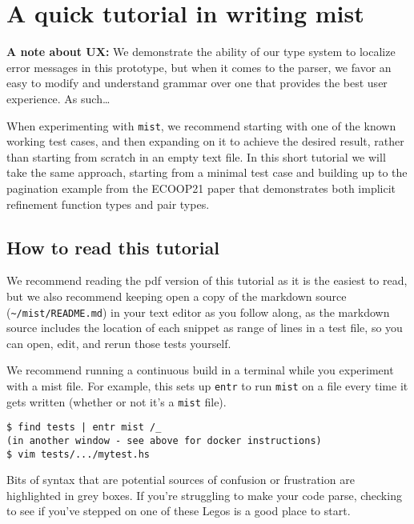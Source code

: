 \documentclass[
]{darts-v2021}
\renewenvironment{quote}{\begin{myquote}}{\end{myquote}}
\begin{document}
\hypertarget{a-quick-tutorial-in-writing-mist}{%
\section{A quick tutorial in writing
mist}\label{a-quick-tutorial-in-writing-mist}}

\begin{quote}
\textbf{A note about UX:} We demonstrate the ability of our type system
to localize error messages in this prototype, but when it comes to the
parser, we favor an easy to modify and understand grammar over one that
provides the best user experience. As such\ldots{}
\end{quote}

When experimenting with \texttt{mist}, we recommend starting with one of
the known working test cases, and then expanding on it to achieve the
desired result, rather than starting from scratch in an empty text file.
In this short tutorial we will take the same approach, starting from a
minimal test case and building up to the pagination example from the
ECOOP21 paper that demonstrates both implicit refinement function types
and pair types.

\hypertarget{how-to-read-this-tutorial}{%
\subsection{How to read this tutorial}\label{how-to-read-this-tutorial}}

We recommend reading the pdf version of this tutorial as it is the
easiest to read, but we also recommend keeping open a copy of the
markdown source (\texttt{\textasciitilde{}/mist/README.md}) in your text
editor as you follow along, as the markdown source includes the location
of each snippet as range of lines in a test file, so you can open, edit,
and rerun those tests yourself.

We recommend running a continuous build in a terminal while you
experiment with a mist file. For example, this sets up \texttt{entr} to
run \texttt{mist} on a file every time it gets written (whether or not
it's a \texttt{mist} file).

\begin{verbatim}
$ find tests | entr mist /_
(in another window - see above for docker instructions)
$ vim tests/.../mytest.hs
\end{verbatim}

\begin{quote}
Bits of syntax that are potential sources of confusion or frustration
are highlighted in grey boxes. If you're struggling to make your code
parse, checking to see if you've stepped on one of these Legos is a good
place to start.
\end{quote}
\end{document}

